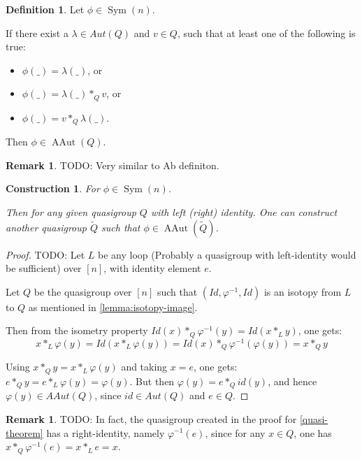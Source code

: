 \documentclass[a4paper, 12pt, english]{article}
\theoremstyle{plain}
\newtheorem{construction}[theorem]{Construction}
\theoremstyle{definition}
\newtheorem{definition}[theorem]{Definition}
\newtheorem{remark}[theorem]{Remark}
\DeclareMathOperator{\AAut}{AAut}
\DeclareMathOperator{\Sym}{Sym}
\begin{document}
\begin{definition}
    Let \( \phi \in \Sym(n) \).
    
    If there exist a \( \lambda \in Aut(Q) \) and \( v \in Q \), such that at least one of the following is true:
    \begin{itemize}
        \item \( \phi(\_) = \lambda(\_) \), or
        \item \( \phi(\_) = \lambda(\_) *_Q v \), or
        \item \( \phi(\_) = v *_Q \lambda(\_) \).
    \end{itemize}

    Then \( \phi \in \AAut(Q) \).
\end{definition}
\begin{remark}
    TODO: Very similar to Ab definiton.
\end{remark}

\begin{construction} \label{construction:affine-automorphism-quasigroup}
    For \( \phi \in \Sym(n) \).

    Then for any given quasigroup \( Q \) with left (right) identity. One can construct another quasigroup \( \tilde{Q} \) such that \( \phi \in \AAut(\tilde{Q}) \).
\end{construction}
\begin{proof}
    TODO:
    Let \( L \) be any loop (Probably a quasigroup with left-identity would be sufficient) over \( [n] \), with identity element \( e \).

    Let \( Q \) be the quasigroup over \( [n] \) such that \( (Id, \varphi^{-1}, Id) \) is an isotopy from \( L \) to \( Q \) as mentioned in \autoref{lemma:isotopy-image}.
    
    Then from the isometry property \( Id(x) *_Q \varphi^{-1}(y) = Id(x *_L y) \), one gets: 
    \[
        x *_L \varphi(y) = Id(x *_L \varphi(y)) = Id(x) *_Q \varphi^{-1}(\varphi(y)) = x *_Q y 
    \]

    Using \( x *_Q y = x *_L \varphi(y) \) and taking \( x = e \), one gets: \( e *_Q y = e *_L \varphi(y) = \varphi(y) \). But then \( \varphi(y) = e *_Q id(y) \), and hence \( \varphi(y) \in AAut(Q) \), since \( id \in Aut(Q) \) and \( e \in Q \).
\end{proof}

\begin{remark}
    TODO:
    In fact, the quasigroup created in the proof for \autoref{quasi-theorem} has a right-identity, namely \( \varphi^{-1}(e) \), since for any \( x \in Q \), one has \( x *_Q \varphi^{-1}(e) = x *_L e = x \).
\end{remark}
\end{document}
